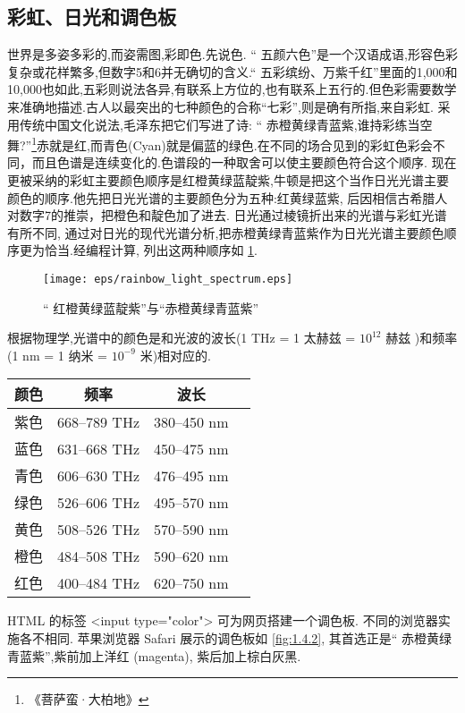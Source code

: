 \subsection{彩虹、日光和调色板}
世界是多姿多彩的,而姿需图,彩即色.先说色.
“ 五颜六色”是一个汉语成语,形容色彩复杂或花样繁多,但数字5和6并无确切的含义.“ 
五彩缤纷、万紫千红”里面的1,000和10,000也如此,五彩则说法各异,有联系上方位的,也有联系上五行的.但色彩需要数学来准确地描述.古人以最突出的七种颜色的合称“七彩”,则是确有所指,来自彩虹.
采用传统中国文化说法,毛泽东把它们写进了诗: “ 赤橙黄绿青蓝紫,谁持彩练当空舞?”\footnote{《菩萨蛮·大柏地》}赤就是红,而青色(Cyan)就是偏蓝的绿色.在不同的场合见到的彩虹色彩会不同，而且色谱是连续变化的.色谱段的一种取舍可以使主要颜色符合这个顺序.
现在更被采纳的彩虹主要颜色顺序是红橙黄绿蓝靛紫,牛顿是把这个当作日光光谱主要颜色的顺序.他先把日光光谱的主要颜色分为五种:红黄绿蓝紫,
后因相信古希腊人对数字7的推崇，把橙色和靛色加了进去.
日光通过棱镜折出来的光谱与彩虹光谱有所不同,
通过对日光的现代光谱分析,把赤橙黄绿青蓝紫作为日光光谱主要颜色顺序更为恰当.经编程计算, 列出这两种顺序如 \ref{fig:1.4.1}.

\begin{figure}[h]
	\centering
	\texttt{[image: eps/rainbow\_light\_spectrum.eps]}
	\caption{“ 红橙黄绿蓝靛紫”与“赤橙黄绿青蓝紫” }
	\label{fig:1.4.1}
\end{figure}
根据物理学,光谱中的颜色是和光波的波长(1 THz = 1 太赫兹 = $10^{12}$ 赫兹 )和频率(1 nm = 1 纳米 = $10^{-9}$ 米)相对应的.
\begin{center}
	\begin{tabular}{c c c c} 
		\hline
		颜色 & 频率 & 波长  \\ [0.5ex] 
		\hline
		紫色 & 668–789 THz & 380–450 nm \\
		蓝色 & 631–668 THz & 450–475 nm \\
		青色 & 606–630 THz & 476–495 nm \\
		绿色 & 526–606 THz & 495–570 nm \\
		黄色 & 508–526 THz & 570–590 nm \\
		橙色 & 484–508 THz & 590–620 nm \\
		红色 & 400–484 THz & 620–750 nm \\		
		\hline
	\end{tabular}
\end{center}

HTML 的标签 <input type="color"> 可为网页搭建一个调色板.
不同的浏览器实施各不相同. 苹果浏览器 Safari 展示的调色板如 \ref{fig:1.4.2},
其首选正是“ 赤橙黄绿青蓝紫”,紫前加上洋红 (magenta), 紫后加上棕白灰黑.

